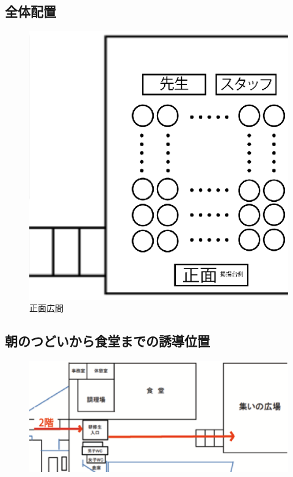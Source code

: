 \subsection{全体配置}
\begin{figure}[h]
\begin{center}
\includegraphics[scale=1.3]{./17/asanotudoihaiti.eps}
\caption{正面広間}
\end{center}
\end{figure}

\subsection{朝のつどいから食堂までの誘導位置}
\begin{figure}[h]
\begin{center}
  \includegraphics[scale=0.6]{./17/asanozu.eps}
\end{center}
\end{figure}


